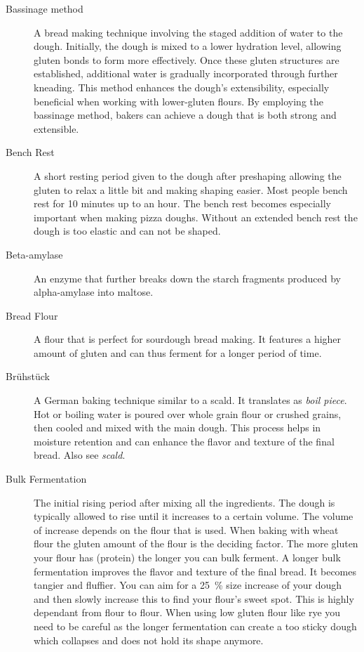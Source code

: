 \begin{description}
\item[Bassinage method] A bread making technique involving the staged addition of water
to the dough. Initially, the dough is mixed to a lower hydration level,
allowing gluten bonds to form more effectively. Once these gluten structures
are established, additional water is gradually incorporated through further
kneading. This method enhances the dough's extensibility, especially beneficial
when working with lower-gluten flours. By employing the bassinage method,
bakers can achieve a dough that is both strong and extensible.

\item[Bench Rest] A short resting period given to the dough after preshaping
allowing the gluten to relax a little bit and making shaping easier. Most people
bench rest for 10 minutes up to an hour. The bench rest becomes especially important
when making pizza doughs. Without an extended bench rest the dough is too elastic and
can not be shaped.

\item[Beta-amylase] An enzyme that further breaks down the starch fragments
produced by alpha-amylase into maltose.

\item[Bread Flour] A flour that is perfect for sourdough bread making. It features
a higher amount of gluten and can thus ferment for a longer period of time.

\item[Brühstück] A German baking technique similar to a scald. It translates as
\emph{boil piece}. Hot or boiling water is poured over whole grain flour or crushed grains,
then cooled and mixed with the main dough. This process helps in moisture retention
and can enhance the flavor and texture of the final bread. Also see \emph{scald}.

\item[Bulk Fermentation] The initial rising period after mixing all the ingredients.
The dough is typically allowed to rise until it increases to a certain volume. The
volume of increase depends on the flour that is used. When baking with wheat flour
the gluten amount of the flour is the deciding factor. The more gluten your flour has
(protein) the longer you can bulk ferment. A longer bulk fermentation improves the
flavor and texture of the final bread. It becomes tangier and fluffier. You can aim
for a \SI{25}{\percent} size increase of your dough and then slowly increase this to find your
flour’s sweet spot. This is highly dependant from flour to flour. When using low gluten
flour like rye you need to be careful as the longer fermentation can create a too
sticky dough which collapses and does not hold its shape anymore.


\end{description}
